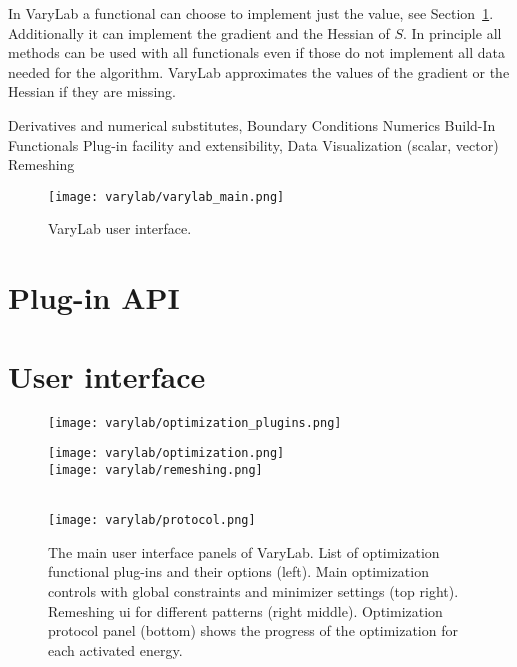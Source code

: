 \documentclass[Thesis.tex]{subfiles}
\begin{document}
In {\sc VaryLab} a functional can choose to implement just the value, see Section~\ref{sec:plugin-api}. Additionally it can implement the gradient and the Hessian of $S$. In principle all methods can be used with all functionals even if those do not implement all data needed for the algorithm. {\sc VaryLab} approximates the values of the gradient or the Hessian if they are missing. 

Derivatives and numerical substitutes, 
Boundary Conditions
Numerics
Build-In Functionals
Plug-in facility and extensibility, 
Data Visualization (scalar, vector)
Remeshing

\begin{figure}
\begin{center}
\texttt{[image: varylab/varylab\_main.png]}
\caption{{\sc VaryLab} user interface.}
\label{fig:varylab_main_ui}
\end{center}
\end{figure}

\section{Plug-in API}
\label{sec:plugin-api}

\section{User interface}

\begin{figure}
\begin{center}
\texttt{[image: varylab/optimization\_plugins.png]}\hfill
\begin{minipage}[b]{0.47\linewidth}
\texttt{[image: varylab/optimization.png]}\\
\texttt{[image: varylab/remeshing.png]}
\end{minipage}\\
\vskip 0.05cm
\texttt{[image: varylab/protocol.png]}
\caption{The main user interface panels of {\sc VaryLab}. List of optimization functional plug-ins and their options (left). Main optimization controls with global constraints and minimizer settings (top right). Remeshing ui for different patterns (right middle). Optimization protocol panel (bottom) shows the progress of the optimization for each activated energy.}
\label{default}
\end{center}
\end{figure}
\end{document}
